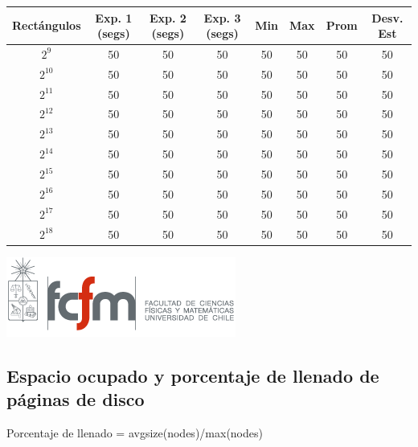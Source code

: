 \documentclass[letterpaper,10pt]{article}
\begin{document}
	\begin{center}

		\begin{tabular}{|c|c|c|c|c|c|c|c|}
			\hline
			Rectángulos	& Exp. 1 (segs) & Exp. 2 (segs) & Exp. 3 (segs) & Min & Max & Prom & Desv. Est\\
			\hline
			$2^{9}$ 	& 50 	& 50 	& 50 	& 50 	& 50 	& 50 	& 50 \\
			\hline
			$2^{10}$ 	& 50 	& 50 	& 50 	& 50 	& 50 	& 50 	& 50 \\
			\hline
			$2^{11}$ 	& 50 	& 50 	& 50 	& 50 	& 50 	& 50 	& 50 \\
			\hline
			$2^{12}$ 	& 50 	& 50 	& 50 	& 50 	& 50 	& 50 	& 50 \\
			\hline
			$2^{13}$ 	& 50 	& 50 	& 50 	& 50 	& 50 	& 50 	& 50 \\
			\hline
			$2^{14}$ 	& 50 	& 50 	& 50 	& 50 	& 50 	& 50 	& 50 \\
			\hline
			$2^{15}$ 	& 50 	& 50 	& 50 	& 50 	& 50 	& 50 	& 50 \\
			\hline
			$2^{16}$ 	& 50 	& 50 	& 50 	& 50 	& 50 	& 50 	& 50 \\
			\hline
			$2^{17}$ 	& 50 	& 50 	& 50 	& 50 	& 50 	& 50 	& 50 \\
			\hline
			$2^{18}$ 	& 50 	& 50 	& 50 	& 50 	& 50 	& 50 	& 50 \\
			\hline
		\end{tabular}

		\includegraphics{logoFCFM.png}
	\end{center}

	\subsection{Espacio ocupado y porcentaje de llenado de páginas de disco}

	Porcentaje de llenado = avgsize(nodes)/max(nodes)
\end{document}
